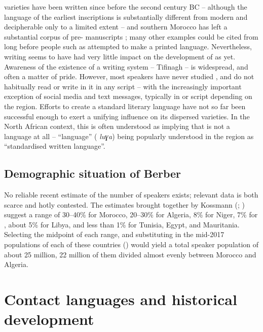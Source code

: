 \documentclass[output=paper]{langsci/langscibook}
\begin{document}
 varieties have been written since before the second century BC \citep{Pichler2007} – although the language of the earliest inscriptions is substantially different from modern  and decipherable only to a limited extent – and southern Morocco has left a substantial corpus of pre- manuscripts \citep{Boogert1997}; many other examples could be cited from long before people such as \citet{Mammeri1976} attempted to make  a printed language. Nevertheless, writing seems to have had very little impact on the development of  as yet. Awareness of the existence of a  writing system – Tifinagh – is widespread, and often a matter of pride. However, most  speakers have never studied , and do not habitually read or write in it in any script – with the increasingly important exception of social media and text messages, typically in  or  script depending on the region. Efforts to create a standard literary  language have not so far been successful enough to exert a unifying influence on its dispersed varieties. In the North African context, this is often understood as implying that  is not a language at all – “language” ( \textit{luɣa}) being popularly understood in the region as “standardised written language”.
\largerpage
 
 \subsection{Demographic situation of Berber}


No reliable recent estimate of the number of  speakers exists; relevant data is both scarce and hotly contested. The estimates brought together by Kossmann (\citeyear[1]{Kossmann2011}; \citeyear[29--36]{Kossmann2013book}) suggest a range of 30–40\% for Morocco, 20–30\% for Algeria, 8\% for Niger, 7\% for , about 5\% for Libya, and less than 1\% for Tunisia, Egypt, and Mauritania.  Selecting the midpoint of each range, and substituting in the mid-2017 populations of each of these countries (\citealt{CIA2017}) would yield a total speaker population of about 25 million, 22 million of them divided almost evenly between Morocco and Algeria.


 \section{Contact languages and historical development}
\end{document}

